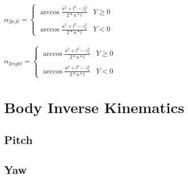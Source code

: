 \documentclass{article}
\begin{document}
    \paragraph{}
    $\alpha_{2left} = \left\{
    \begin{array}{ll}
    \arccos \frac{u^2 + l^2 - z_1^2}{2 * u * l} & Y \ge 0 \\ \\
    \arccos \frac{u^2 + l^2 - z_2^2}{2 * u * l} & Y < 0
    \end{array}
    \right. $   

    \paragraph{}
    $\alpha_{2right} = \left\{
    \begin{array}{ll}
    \arccos \frac{u^2 + l^2 - z_2^2}{2 * u * l} & Y \ge 0 \\ \\
    \arccos \frac{u^2 + l^2 - z_1^2}{2 * u * l} & Y < 0
    \end{array}
    \right. $  

    \paragraph{}



    \section{Body Inverse Kinematics}
    \paragraph{}

    \subsection{Pitch}
    \paragraph{}

    \subsection{Yaw}
    \paragraph{}
\end{document}
